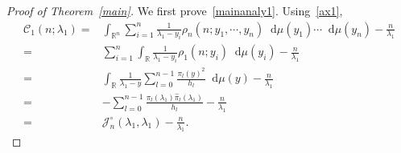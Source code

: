 \documentclass[a4paper]{article}
\theoremstyle{plain}
\theoremstyle{definition}
\newcommand{\dif}{\mathop{}\!\mathrm{d}}
\newcommand{\RR}{\mathbb{R}}
\newcommand{\nn}{\nonumber}
\begin{document}
	\begin{proof}[Proof of Theorem~\ref{main}]
		We first prove~\eqref{mainanaly1}. Using~\eqref{ax1},
		\begin{align}
	\mathcal C_1(n;\lambda_1)=&\int_{\RR^n}\sum_{i=1}^n\frac{1}{\lambda_1-y_i}\rho_n(n;y_1,\cdots,y_n)\dif\mu(y_1)\cdots\dif\mu(y_n)-\frac{n}{\lambda_1}\nn\\
	=&\sum_{i=1}^n\int_{\RR}\frac{1}{\lambda_1-y_i}\rho_1(n;y_i)\dif\mu(y_i)-\frac{n}{\lambda_1}\nn\\
	=&\int_{\RR}\frac{1}{\lambda_1-y}\sum_{l=0}^{n-1}\frac{\pi_l(y)^2}{h_l}\dif\mu(y)-\frac{n}{\lambda_1}\nn\\
	=&-\sum_{l=0}^{n-1}\frac{\pi_l(\lambda_1)\widehat\pi_l(\lambda_1)}{h_l}-\frac{n}{\lambda_1}\nn\\
	=&\mathcal J_n^\circ(\lambda_1,\lambda_1)-\frac{n}{\lambda_1}. \label{pf1}
	\end{align}


\end{proof}
\end{document}
